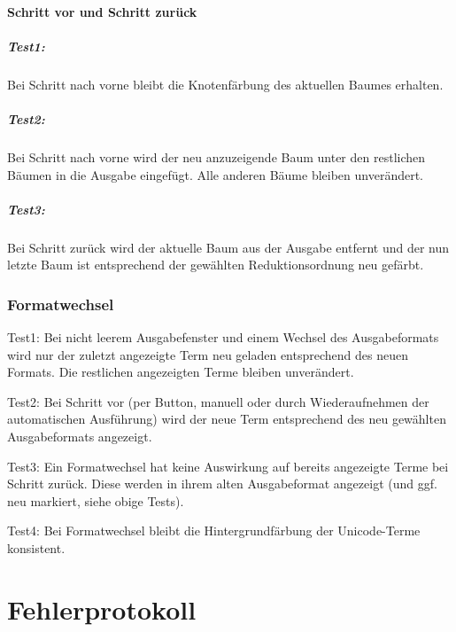 \documentclass[parskip=full,11pt,openany]{scrreprt}
\begin{document}
\subsubsection{Schritt vor und Schritt zurück}
\paragraph{Test1:} Bei Schritt nach vorne bleibt die Knotenfärbung des aktuellen Baumes erhalten.

\paragraph{Test2:} Bei Schritt nach vorne wird der neu anzuzeigende Baum unter den restlichen Bäumen in die Ausgabe eingefügt. Alle anderen Bäume bleiben unverändert.

\paragraph{Test3:} Bei Schritt zurück wird der aktuelle Baum aus der Ausgabe entfernt und der nun letzte Baum ist entsprechend der gewählten Reduktionsordnung neu gefärbt.

\subsection{Formatwechsel}
Test1: Bei nicht leerem Ausgabefenster und einem Wechsel des Ausgabeformats wird nur der zuletzt angezeigte Term neu geladen entsprechend des neuen Formats. Die restlichen angezeigten Terme bleiben unverändert.

Test2: Bei Schritt vor (per Button, manuell oder durch Wiederaufnehmen der automatischen Ausführung) wird der neue Term entsprechend des neu gewählten Ausgabeformats angezeigt. 

Test3: Ein Formatwechsel hat keine Auswirkung auf bereits angezeigte Terme bei Schritt zurück. Diese werden in ihrem alten Ausgabeformat angezeigt (und ggf. neu markiert, siehe obige Tests).

Test4: Bei Formatwechsel bleibt die Hintergrundfärbung der Unicode-Terme konsistent. %



\chapter{Fehlerprotokoll}

\newcommand{\issue}[3]{%
	\item[]
	\begin{itemize}[noitemsep]
		\item[]\textbf{#1}
		\item[\textbf{Grund:}]#2
		\item[\textbf{Behebung:}]#3
\end{itemize}}
\end{document}
